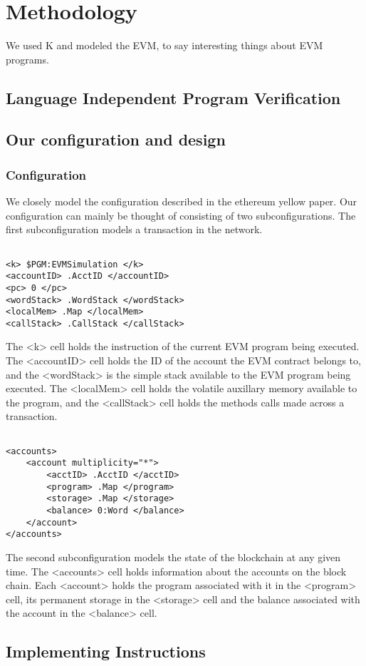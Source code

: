 \section{Methodology}
We used K and modeled the EVM, to say interesting things about EVM programs.
\subsection{Language Independent Program Verification}
\subsection{Our configuration and design}
\subsubsection{Configuration}
We closely model the configuration described in the ethereum yellow paper. Our configuration can mainly be thought of consisting of two subconfigurations. The first subconfiguration models a transaction in the network.  
\begin{verbatim}

<k> $PGM:EVMSimulation </k>
<accountID> .AcctID </accountID>
<pc> 0 </pc>
<wordStack> .WordStack </wordStack>
<localMem> .Map </localMem>
<callStack> .CallStack </callStack>

\end{verbatim}

The <k> cell holds the instruction of the current EVM program being executed. The <accountID> cell holds the ID of the account the EVM contract belongs to, and the <wordStack> is the simple stack available to the EVM program being executed. The <localMem> cell holds the volatile auxillary memory available to the program, and the <callStack> cell holds the methods calls made across a transaction. 

\begin{verbatim}

<accounts>
    <account multiplicity="*">
        <acctID> .AcctID </acctID>
        <program> .Map </program>
        <storage> .Map </storage>
        <balance> 0:Word </balance>
    </account>
</accounts>

\end{verbatim}

The second subconfiguration models the state of the blockchain at any given time. The <accounts> cell holds information about the accounts on the block chain. Each <account> holds the program associated with it in the <program> cell, its permanent storage in the <storage> cell and the balance associated with the account in the <balance> cell. 

\subsection{Implementing Instructions}

